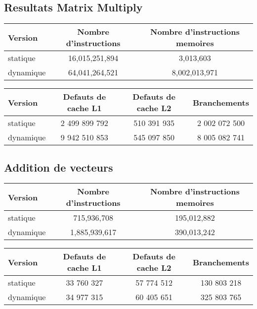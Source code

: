 \documentclass{rapport}
\begin{document}
\subsection{Resultats Matrix Multiply}

\begin{table}[H]
\centering
    \begin{tabular}{|l|c|c|}
    \hline
    Version & Nombre d'instructions & Nombre d'instructions memoires \\
    \hline
    statique & 16,015,251,894 & 3,013,603 \\
    dynamique & 64,041,264,521 & 8,002,013,971 \\
    \hline
    \end{tabular}
\end{table}

\begin{table}[H]
\centering
    \begin{tabular}{|l|c|c|c|}
    \hline
    Version & Defauts de cache L1 & Defauts de cache L2 & Branchements \\
    \hline
    statique & 2 499 899 792 & 510 391 935 & 2 002 072 500 \\
    dynamique & 9 942 510 853 & 545 097 850 & 8 005 082 741 \\
    \hline
    \end{tabular}
\end{table}

\subsection{Addition de vecteurs}

\begin{table}[H]
\centering
    \begin{tabular}{|l|c|c|}
    \hline
    Version & Nombre d'instructions & Nombre d'instructions memoires \\
    \hline
    statique & 715,936,708 & 195,012,882 \\
    dynamique & 1,885,939,617 & 390,013,242 \\
    \hline
    \end{tabular}
\end{table}

\begin{table}[H]
\centering
    \begin{tabular}{|l|c|c|c|}
    \hline
    Version & Defauts de cache L1 & Defauts de cache L2 & Branchements \\
    \hline
    statique & 33 760 327 & 57 774 512 & 130 803 218 \\
    dynamique & 34 977 315 & 60 405 651 & 325 803 765 \\
    \hline
    \end{tabular}
\end{table}
\end{document}
